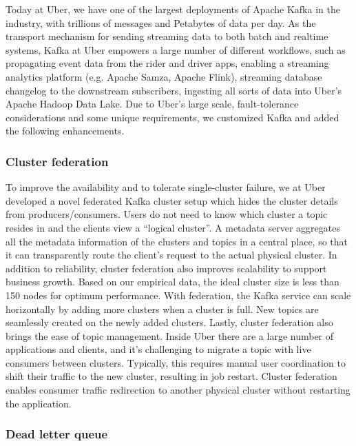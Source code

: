 \documentclass[sigconf]{acmart}
\begin{document}
Today at Uber, we have one of the largest deployments of Apache Kafka in the industry, with trillions of messages and Petabytes of data per day. As the transport mechanism for sending streaming data to both batch and realtime systems, Kafka at Uber empowers a large number of different workflows, such as propagating event data from the rider and driver apps, enabling a streaming analytics platform (e.g. Apache Samza\cite{samza}, Apache Flink), streaming database changelog to the downstream subscribers, ingesting all sorts of data into Uber’s Apache Hadoop Data Lake. Due to Uber’s large scale, fault-tolerance considerations and some unique requirements, we customized Kafka and added the following enhancements.

\subsubsection{Cluster federation}

To improve the availability and to tolerate single-cluster failure, we at Uber developed a novel federated Kafka cluster setup which hides the cluster details from producers/consumers. Users do not need to know which cluster a topic resides in and the clients view a “logical cluster”. A metadata server aggregates all the metadata information of the clusters and topics in a central place, so that it can transparently route the client’s request to the actual physical cluster. In addition to reliability, cluster federation also improves scalability to support business growth. Based on our empirical data, the ideal cluster size is less than 150 nodes for optimum performance. With federation, the Kafka service can scale horizontally by adding more clusters when a cluster is full. New topics are seamlessly created on the newly added clusters. Lastly, cluster federation also brings the ease of topic management. Inside Uber there are a large number of applications and clients, and it’s challenging to migrate a topic with live consumers between clusters. Typically, this requires manual user coordination to shift their traffic to the new cluster, resulting in job restart. Cluster federation enables consumer traffic redirection to another physical cluster without restarting the application.

\subsubsection{Dead letter queue}
\end{document}
